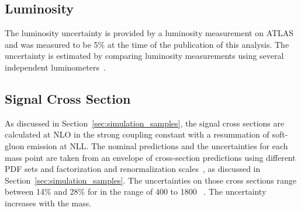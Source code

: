 \subsection{Luminosity}
The luminosity uncertainty is provided by a luminosity measurement on ATLAS and was measured to be 5\% at the time of the publication of this analysis.
The uncertainty is estimated by comparing luminosity measurements using several independent luminometers~\cite{DAPR-2013-01}.

\subsection{Signal Cross Section}
As discussed in Section~\ref{sec:simulation_samples}, the signal cross sections are calculated at \ac{NLO} in the strong coupling constant with a resummation of soft-gluon emission at \ac{NLL}. 
The nominal predictions and the uncertainties for each mass point are taken from an envelope of cross-section predictions using different \ac{PDF} sets and factorization and renormalization scales~\cite{Kramer:2012bx}, as discussed in Section~\ref{sec:simulation_samples}.
The uncertainties on those cross sections range between 14\% and 28\% for \rhadrons in the range of 400 to 1800 \GeV~\cite{Mackeprang:2006gx, Mackeprang:2009ad}. 
The uncertainty increases with the mass.


